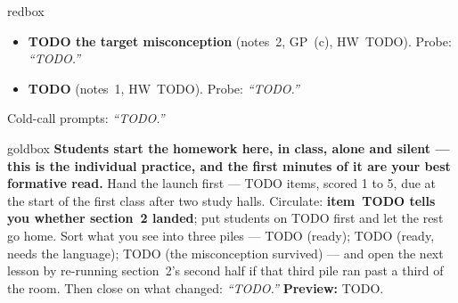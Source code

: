 \documentclass[10pt]{article}
\begin{document}
\boxguard
\begin{skillbox}{redbox}
\begin{itemize}[leftmargin=1.2em, nosep]
  \item \textbf{TODO the target misconception} (notes~2, GP~(c), HW~TODO). Probe: \emph{``TODO.''}
  \item \textbf{TODO} (notes~1, HW~TODO). Probe: \emph{``TODO.''}
\end{itemize}
Cold-call prompts: \emph{``TODO.''}
\end{skillbox}

\boxguard
\begin{skillbox}{goldbox}
\textbf{Students start the homework here, in class, alone and silent --- this is the individual
practice, and the first minutes of it are your best formative read.} Hand the launch first ---
TODO items, scored 1 to 5, due at the start of the first class after two study halls. Circulate: \textbf{item~TODO tells you whether section~2
landed}; put students on TODO first and let the rest go home. Sort what you see into three piles
--- TODO (ready); TODO (ready, needs the language); TODO (the misconception survived) --- and open
the next lesson by re-running section~2's second half if that third pile ran past a third of the
room. Then close on what changed: \emph{``TODO.''} \textbf{Preview:} TODO.
\end{skillbox}

\begin{teachernote}[Warm-Up]
\end{teachernote}

\begin{teachernote}[Guided Notes \& Practice]
\end{teachernote}

\begin{teachernote}[Homework]
\end{teachernote}
\end{document}

